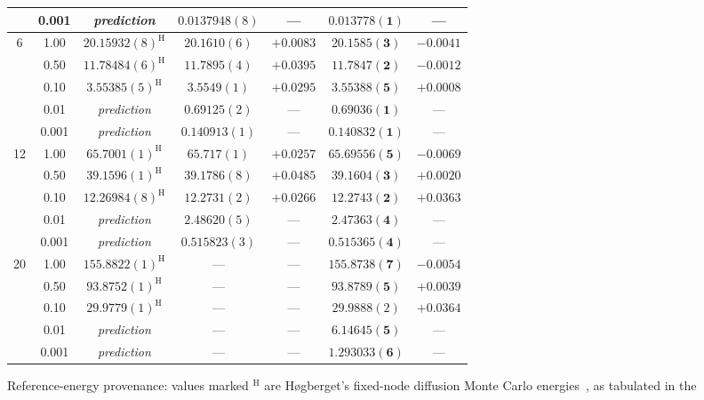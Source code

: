 \begin{table}[htbp]
\begin{threeparttable}
\begin{tabular}{c|c|c|cc|cc}
         & 0.001 & \emph{prediction} & $0.0137948(8)$ & --- & $\mathbf{0.013778(1)}$ & --- \\
    \midrule
      6 & 1.00 & $20.15932(8)^{\mathrm{H}}$ & $20.1610(6)$ & $+0.0083$ & $\mathbf{20.1585(3)}$ & $-0.0041$ \\
         & 0.50 & $11.78484(6)^{\mathrm{H}}$ & $11.7895(4)$ & $+0.0395$ & $\mathbf{11.7847(2)}$ & $-0.0012$ \\
         & 0.10 & $3.55385(5)^{\mathrm{H}}$ & $3.5549(1)$ & $+0.0295$ & $\mathbf{3.55388(5)}$ & $+0.0008$ \\
         & 0.01 & \emph{prediction} & $0.69125(2)$ & --- & $\mathbf{0.69036(1)}$ & --- \\
         & 0.001 & \emph{prediction} & $0.140913(1)$ & --- & $\mathbf{0.140832(1)}$ & --- \\
    \midrule
      12 & 1.00 & $65.7001(1)^{\mathrm{H}}$ & $65.717(1)$ & $+0.0257$ & $\mathbf{65.69556(5)}$ & $-0.0069$ \\
         & 0.50 & $39.1596(1)^{\mathrm{H}}$ & $39.1786(8)$ & $+0.0485$ & $\mathbf{39.1604(3)}$ & $+0.0020$ \\
         & 0.10 & $12.26984(8)^{\mathrm{H}}$ & $12.2731(2)$ & $+0.0266$ & $\mathbf{12.2743(2)}$ & $+0.0363$ \\
         & 0.01 & \emph{prediction} & $2.48620(5)$ & --- & $\mathbf{2.47363(4)}$ & --- \\
         & 0.001 & \emph{prediction} & $0.515823(3)$ & --- & $\mathbf{0.515365(4)}$ & --- \\
    \midrule
      20 & 1.00 & $155.8822(1)^{\mathrm{H}}$ & --- & --- & $\mathbf{155.8738(7)}$ & $-0.0054$ \\
         & 0.50 & $93.8752(1)^{\mathrm{H}}$ & --- & --- & $\mathbf{93.8789(5)}$ & $+0.0039$ \\
         & 0.10 & $29.9779(1)^{\mathrm{H}}$ & --- & --- & $29.9888(2)$ & $+0.0364$ \\
         & 0.01 & \emph{prediction} & --- & --- & $\mathbf{6.14645(5)}$ & --- \\
         & 0.001 & \emph{prediction} & --- & --- & $\mathbf{1.293033(6)}$ & --- \\
    \bottomrule
    \end{tabular}
    \begin{tablenotes}\footnotesize
      \item[] Reference-energy provenance: values marked $^{\mathrm{H}}$ are H{\o}gberget's
      fixed-node diffusion Monte Carlo energies~\cite{Hogberget2013-DMC}, as tabulated in the

\end{tablenotes}
\end{threeparttable}
\end{table}
